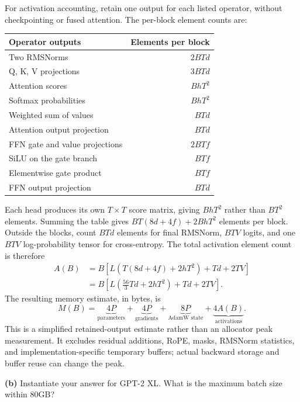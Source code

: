 For activation accounting, retain one output for each listed operator,
without checkpointing or fused attention. The per-block element counts are:
\begin{center}
\begin{tabular}{lr}
\toprule
Operator outputs & Elements per block \\
\midrule
Two RMSNorms & $2BTd$ \\
Q, K, V projections & $3BTd$ \\
Attention scores & $BhT^2$ \\
Softmax probabilities & $BhT^2$ \\
Weighted sum of values & $BTd$ \\
Attention output projection & $BTd$ \\
FFN gate and value projections & $2BTf$ \\
SiLU on the gate branch & $BTf$ \\
Elementwise gate product & $BTf$ \\
FFN output projection & $BTd$ \\
\bottomrule
\end{tabular}
\end{center}
Each head produces its own $T\times T$ score matrix, giving $BhT^2$ rather
than $BT^2$ elements. Summing the table gives
$BT(8d+4f)+2BhT^2$ elements per block. Outside the blocks, count $BTd$ elements
for final RMSNorm, $BTV$ logits, and one $BTV$ log-probability tensor for
cross-entropy. The total activation element count is therefore
\begin{align*}
A(B)&=B\left[L\left(T(8d+4f)+2hT^2\right)+Td+2TV\right]\\
&=B\left[L\left(\frac{56}{3}Td+2hT^2\right)+Td+2TV\right].
\end{align*}
The resulting memory estimate, in bytes, is
\[
\boxed{M(B)=\underbrace{4P}_{\text{parameters}}
             +\underbrace{4P}_{\text{gradients}}
             +\underbrace{8P}_{\text{AdamW state}}
             +\underbrace{4A(B)}_{\text{activations}}.}
\]
This is a simplified retained-output estimate rather than an allocator peak
measurement. It excludes residual additions, RoPE, masks, RMSNorm statistics,
and implementation-specific temporary buffers; actual backward storage and
buffer reuse can change the peak.

\textbf{(b)} Instantiate your answer for GPT-2 XL. What is the maximum batch size within 80GB?


